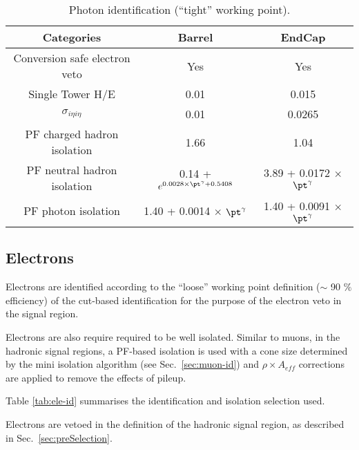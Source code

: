 \begin{table}[ht!]
  \caption{Photon identification (``tight'' working point).\label{tab:photon-id-gamma}}
  \centering
  \footnotesize
  \begin{tabular}{ ccc }
    \hline
    \hline
    Categories                    & Barrel                             & EndCap                             \\
    \hline
    Conversion safe electron veto & Yes                                & Yes                                \\
    Single Tower H/E              & 0.01                               & 0.015                               \\
    $\sigma_{i\eta i\eta}$        & 0.01                               & 0.0265                               \\
    PF charged hadron isolation   & 1.66                               & 1.04                               \\
    PF neutral hadron isolation   & 0.14 + $ e^{0.0028 \times \pt^{\gamma} + 0.5408}$  &  3.89 + 0.0172 $\times$ $\pt^{\gamma}$\\
    PF photon isolation           & 1.40 + 0.0014 $\times$ $\pt^{\gamma}$ & 1.40 + 0.0091 $\times$ $\pt^{\gamma}$ \\
    \hline
    \hline
  \end{tabular}
  \end{table}


\subsection{Electrons}
\label{sec:electron-id}
Electrons are identified according to the ``loose'' working point definition ($\sim$ 90 $\%$ efficiency) 
of the cut-based identification \cite{electron-id} for the purpose of the electron veto in the signal region.

Electrons are also require required to be well isolated. 
Similar to muons, in the hadronic signal regions, a PF-based isolation
\cite{pf-photon} is used with a cone size determined by the mini
isolation algorithm (see Sec.~\ref{sec:muon-id}) and $\rho\times A_{eff}$ 
corrections are applied to remove the effects of pileup.

Table \ref{tab:ele-id} summarises the identification and isolation
selection used. 

Electrons are vetoed in the definition of the hadronic signal region, 
as described in Sec.~\ref{sec:preSelection}.


